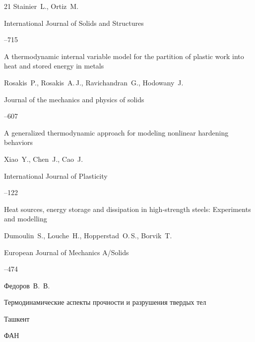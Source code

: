 \begin{thebibliography}{21}
\by Stainier~L., Ortiz~M.

\jour International Journal of Solids and Structures



--715




\paper A thermodynamic internal variable model for the partition of plastic work into heat and stored energy in metals

\by Rosakis~P., Rosakis~A.\,J., Ravichandran~G., Hodowany~J.

\jour Journal of the mechanics and physics of solids



--607




\paper A generalized thermodynamic approach for modeling nonlinear hardening behaviors

\by Xiao~Y., Chen~J., Cao~J.

\jour International Journal of Plasticity



--122




\paper Heat sources, energy storage and dissipation in high-strength steels: Experiments and modelling

\by Dumoulin~S., Louche~H., Hopperstad~O.\,S., Borvik~T.

\jour European Journal of Mechanics A/Solids



--474




\by Федоров~В.~В.

\book Термодинамические аспекты прочности и разрушения твердых тел

\publaddr Ташкент

\publ ФАН






\end{thebibliography}
